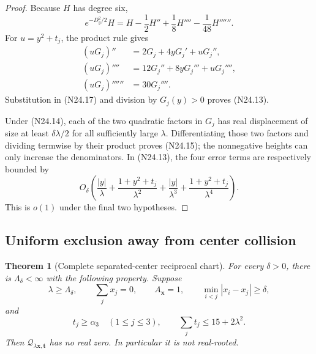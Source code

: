 \documentclass[11pt]{article}
\newtheorem{theorem}{Theorem}[section]
\theoremstyle{definition}
\theoremstyle{remark}
\begin{document}
\begin{proof}
Because \(H\) has degree six,
\[
 e^{-D_y^2/2}H=H-\frac12H''+\frac18H''''-\frac1{48}H''''''.
 \tag{N24.17}
\]
For \(u=y^2+t_j\), the product rule gives
\[
\begin{aligned}
 (uG_j)''&=2G_j+4yG_j'+uG_j'',\\
 (uG_j)''''&=12G_j''+8yG_j'''+uG_j'''',\\
 (uG_j)''''''&=30G_j''''.
\end{aligned}
\tag{N24.18}
\]
Substitution in \textup{(N24.17)} and division by \(G_j(y)>0\)
proves \textup{(N24.13)}.

Under \textup{(N24.14)}, each of the two quadratic factors in \(G_j\)
has real displacement of size at least \(\delta\lambda/2\) for all
sufficiently large \(\lambda\).  Differentiating those two factors and
dividing termwise by their product proves \textup{(N24.15)}; the
nonnegative heights can only increase the denominators.  In
\textup{(N24.13)}, the four error terms are respectively bounded by
\[
 O_\delta\!\left(
 \frac{|y|}{\lambda}
 +\frac{1+y^2+t_j}{\lambda^2}
 +\frac{|y|}{\lambda^3}
 +\frac{1+y^2+t_j}{\lambda^4}
 \right).
 \tag{N24.19}
\]
This is \(o(1)\) under the final two hypotheses.
\end{proof}

\subsection{Uniform exclusion away from center collision}
\label{subsec:f2v24-uniform}

\begin{theorem}[Complete separated-center reciprocal chart]
\label{thm:f2v24-complete-separated}
For every \(\delta>0\), there is \(\Lambda_\delta<\infty\) with the
following property.  Suppose
\[
 \lambda\geq\Lambda_\delta,\qquad
 \sum_jx_j=0,\qquad A_{\bm x}=1,
 \qquad \min_{i<j}|x_i-x_j|\geq\delta,
 \tag{N24.20}
\]
and
\[
 t_j\geq\alpha_3\quad(1\leq j\leq3),
 \qquad \sum_jt_j\leq15+2\lambda^2.
 \tag{N24.21}
\]
Then \(\mathcal Q_{\lambda\bm x,\bm t}\) has no real zero.  In
particular it is not real-rooted.
\end{theorem}
\end{document}
